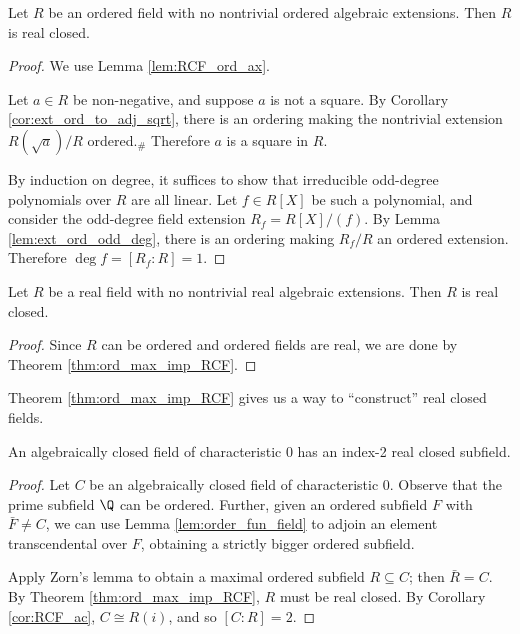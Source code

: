 \begin{theorem}
  \label{thm:ord_max_imp_RCF}
  \leanok
  Let $R$ be an ordered field with no nontrivial ordered algebraic extensions. Then $R$ is real closed.
\end{theorem}
\begin{proof}
  \leanok
  We use Lemma \ref{lem:RCF_ord_ax}. 

  Let $a\in R$ be non-negative, and suppose $a$ is not a square. By Corollary \ref{cor:ext_ord_to_adj_sqrt}, there is an ordering making the nontrivial extension $R(\sqrt{a})/R$ ordered.$_\#$ Therefore $a$ is a square in $R$.

  By induction on degree, it suffices to show that irreducible odd-degree polynomials over $R$ are all linear. Let $f\in R[X]$ be such a polynomial, and consider the odd-degree field extension $R_f=R[X]/(f)$. By Lemma \ref{lem:ext_ord_odd_deg}, there is an ordering making $R_f/R$ an ordered extension. Therefore $\deg f=[R_f:R]=1$.
\end{proof}

\begin{corollary}
  \label{cor:real_max_imp_RCF}
  \leanok
  Let $R$ be a real field with no nontrivial real algebraic extensions. Then $R$ is real closed.
\end{corollary}
\begin{proof}
  \leanok
  Since $R$ can be ordered and ordered fields are real, we are done by Theorem \ref{thm:ord_max_imp_RCF}.
\end{proof}

Theorem \ref{thm:ord_max_imp_RCF} gives us a way to ``construct'' real closed fields.

\begin{lemma}
  \label{lem:ACF_ind_2_RCF}
  An algebraically closed field of characteristic 0 has an index-2 real closed subfield.
\end{lemma}
\begin{proof}
  Let $C$ be an algebraically closed field of characteristic 0. Observe that the prime subfield $\Q$ can be ordered. Further, given an ordered subfield $F$ with $\bar{F}\neq C$, we can use Lemma \ref{lem:order_fun_field} to adjoin an element transcendental over $F$, obtaining a strictly bigger ordered subfield.
  
  Apply Zorn's lemma to obtain a maximal ordered subfield $R\subseteq C$; then $\bar{R}=C$. By Theorem \ref{thm:ord_max_imp_RCF}, $R$ must be real closed. By Corollary \ref{cor:RCF_ac}, $C\cong R(i)$, and so $[C:R]=2$.
\end{proof}

